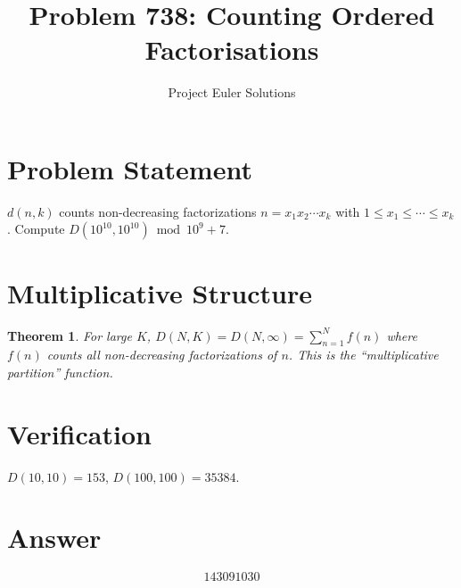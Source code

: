 \documentclass[11pt]{article}
\title{Problem 738: Counting Ordered Factorisations}
\author{Project Euler Solutions}
\date{}
\newtheorem{theorem}{Theorem}
\begin{document}
\maketitle


\section{Problem Statement}
$d(n,k)$ counts non-decreasing factorizations $n = x_1 x_2 \cdots x_k$ with $1 \le x_1 \le \cdots \le x_k$. Compute $D(10^{10}, 10^{10}) \bmod 10^9+7$.

\section{Multiplicative Structure}
\begin{theorem}
For large $K$, $D(N,K) = D(N, \infty) = \sum_{n=1}^{N} f(n)$ where $f(n)$ counts all non-decreasing factorizations of $n$. This is the ``multiplicative partition'' function.
\end{theorem}

\section{Verification}
$D(10,10) = 153$, $D(100,100) = 35384$.

\section{Answer}

\[
\boxed{143091030}
\]
\end{document}
